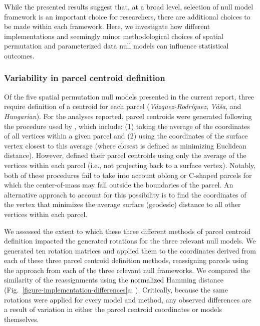 \documentclass[12pt,aps,pra,reprint,showkeys]{revtex4-1}
\newcommand{\nimg}[1]{\textcolor{black}{{#1}}}
\begin{document}
While the presented results suggest that, at a broad level, selection of null model framework is an important choice for researchers, there are additional choices to be made within each framework.
Here, we investigate how different implementations and seemingly minor methodological choices of spatial permutation and parameterized data null models can influence statistical outcomes.

\subsubsection*{Variability in parcel centroid definition}

Of the five spatial permutation null models presented in the current report, three require definition of a centroid for each parcel (\textit{V{\'a}zquez-Rodr{\'i}guez}, \textit{V{\'a}{\v{s}}a}, and \textit{Hungarian}).
For the analyses reported, parcel centroids were generated following the procedure used by \citet{vazquezrodriguez2019pnas}, which include: (1) taking the average of the coordinates of all vertices within a given parcel and (2) using the coordinates of the surface vertex closest to this average (where closest is defined as minimizing Euclidean distance).
However, \citet{vasa2018cercor} defined their parcel centroids using only the average of the vertices within each parcel (i.e., not projecting back to a surface vertex).
Notably, both of these procedures fail to take into account oblong or C-shaped parcels for which the center-of-mass may fall outside the boundaries of the parcel.
An alternative approach to account for this possibility is to find the coordinates of the vertex that minimizes the average surface (geodesic) distance to all other vertices within each parcel.

We assessed the extent to which these three different methods of parcel centroid definition impacted the generated rotations for the three relevant null models.
We generated ten rotation matrices and applied them to the coordinates derived from each of these three parcel centroid definition methods, reassigning parcels using the approach from each of the three relevant null frameworks.
We compared the similarity of the reassignments using the \nimg{normalized} Hamming distance (Fig.~\ref{figure-implementation-differences}a; \citealt{hamming1950distance}).
Critically, because the same rotations were applied for every model and method, any observed differences are a result of variation in either the parcel centroid coordinates or models themselves.
\end{document}
